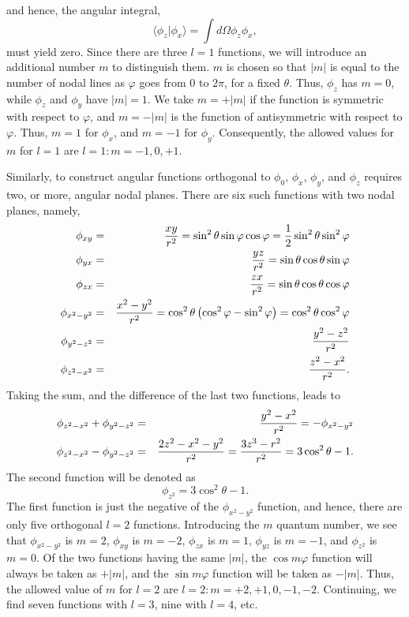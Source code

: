 
\noindent
and hence, the angular integral,
\begin{equation}
\langle \phi_z | \phi_x \rangle = \int d \Omega \phi_z \phi_x ,
\end{equation}
must yield zero. Since there are three $l = 1$ functions, we will introduce 
an additional number $m$ to distinguish them.  $m$ is chosen so that $| 
m |$ is equal to the number of nodal lines as $\varphi$ goes from 0 to $2 
\pi$, for a fixed $\theta$.  Thus, $\phi_z$ has $m = 0$, while $\phi_z$ 
and $\phi_y$ have $| m | = 1$.  We take $m = + | m|$ if the function is 
symmetric with respect to $\varphi$, and $m = - | m |$ is the 
function of 
antisymmetric with respect to $\varphi$.  Thus, $m = 1$ for $\phi_x$, and 
$m = -1$ for $\phi_y$.  Consequently, the allowed
values for $m$ for $l = 1$ are $l = 1 : m = - 1 , 0 , +1$.

Similarly, to construct angular functions orthogonal to $\phi_0$, 
$\phi_x$, $\phi_y$, and $\phi_z$ requires two, or more, angular nodal 
planes. There are six such functions with two nodal planes, namely,
\begin{eqnarray}
\phi_{xy} &=& {xy \over r^2} = \sin^2 \theta \sin \varphi \cos \varphi = 
{1 \over 2} \sin^2 \theta \sin^2 \varphi\cr
\phi_{yx} &=& {yz \over r^2} = \sin \theta \cos \theta \sin \varphi\cr
\phi_{zx} &=& {zx \over r^2} = \sin \theta \cos \theta \cos \varphi\cr
\phi_{x^2-y^2} &=& {x^2 - y^2 \over r^2} = \cos^2 \theta \left( \cos^2 
\varphi - \sin^2 \varphi \right) = \cos^2 \theta \cos^2 \varphi\cr
\phi_{y^2-z^2} &=& {y^2 - z^2 \over r^2}\cr
\phi_{z^2-x^2} &=& {z^2 - x^2 \over r^2}.
\end{eqnarray}
Taking the sum, and the difference of the last two functions, leads to
\begin{eqnarray}
\phi_{z^2-x^2} + \phi_{y^2-z^2} &=& {y^2 - x^2 \over r^2} = - 
\phi_{x^2-y^2}\cr
\phi_{z^2-x^2} - \phi_{y^2-z^2} &=& {2z^2 -x^2 - y^2 \over r^2} = {3z^3 
-r^2 \over r^2} = 3 \cos^2 \theta -1.
\end{eqnarray}
The second function will be denoted as
\begin{equation}
\phi_{z^2} = 3 \cos^2 \theta - 1.
\end{equation}
The first function is just the negative of the $\phi_{x^2-y^2}$ function, 
and hence, there are only five orthogonal $l = 2$ functions.  Introducing 
the $m$ quantum number, we see that $\phi_{x^2-y^2}$ is $m = 2$, 
$\phi_{xy}$ is $m = -2$, $\phi_{zx}$ is $m = 1$, $\phi_{yz}$ is $m = - 1$, 
and $\phi_{z^2}$ is $m = 0$.  Of the two functions having the same $|m|$, 
the $\cos m \varphi$ function will always be taken as $+| m |$, and the $\sin 
m \varphi$ function will be taken as $- | m |$.  
Thus, the allowed value of $m$ for $l = 2$ are $l = 2 : m = +2 , + 1 , 
0 , -1 , -2$.  Continuing, we find seven functions with $l = 3$, nine 
with $l = 4$, etc.

